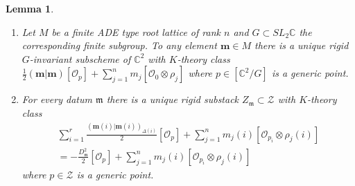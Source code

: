 \documentclass{amsart}
\newtheorem{lemma}[theorem]{Lemma}
\theoremstyle{definition}
\newcommand{\half}{\frac{1}{2}}
\newcommand{\CC} {{\mathbb C}}          %
\newcommand{\mdata}{\mathfrak{m}}
\renewcommand{\O}{\mathcal{O}}
\newcommand{\Zcal}{\mathcal{Z}}
\newcommand{\mvec}{\bm{m}}
\begin{document}
\begin{lemma}
\label{lem:rigidsh}
	\begin{enumerate}
		\item Let $M$ be a finite ADE type root lattice of rank $n$ and $G \subset SL_{2}\CC$ the corresponding finite subgroup. To any element $\mvec \in M$ there is a unique rigid $G$-invariant subscheme of $\mathbb{C}^2$ with $K$-theory class 
		$\half (\mvec|\mvec)[\O_{p}] + \sum_{j=1}^{n}
		m_{j}[\O_{0}\otimes \rho_{j}]$ where $p \in [\mathbb{C}^2/G]$ is a generic point.
		\item For every datum $\mdata$ there is a unique rigid substack $Z_{\mdata} \subset \mathcal{Z}$ with $K$-theory class \begin{gather*}\sum_{i=1}^r\frac{(\mvec(i)|\mvec(i))_{\Delta (i)}}{2}[\O_{p}] + \sum_{j=1}^{n}
		m_{j}(i)[\O_{p_i}\otimes \rho_{j}(i)]\\=-\frac{
		D_{\mdata}^{2}}{2}[\O_{p}] + \sum_{j=1}^{n}
		m_{j}(i)[\O_{p_i}\otimes \rho_{j}(i)]
		\end{gather*} where $p \in \Zcal$ is a generic point.
	\end{enumerate}
\end{lemma}
\end{document}
